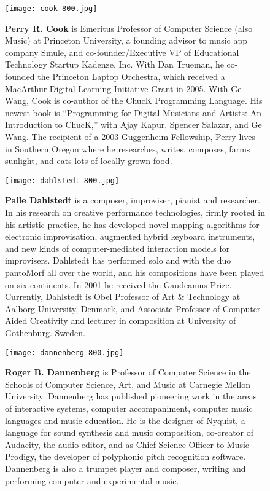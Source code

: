 \begin{authbio}
\begin{figure}[H]
  \sidecaption[t]
  \texttt{[image: cook-800.jpg]}
  \caption{\textbf{Perry R. Cook} is Emeritus Professor of Computer Science (also Music) at Princeton University, a founding advisor to music app company Smule, and co-founder/Executive VP of Educational Technology Startup Kadenze, Inc. With Dan Trueman, he co-founded the Princeton Laptop Orchestra, which received a MacArthur Digital Learning Initiative Grant in 2005. With Ge Wang, Cook is co-author of the ChucK Programming Language. His newest book is ``Programming for Digital Musicians and Artists: An Introduction to ChucK,'' with Ajay Kapur, Spencer Salazar, and Ge Wang. The recipient of a 2003 Guggenheim Fellowship, Perry lives in Southern Oregon where he researches, writes, composes, farms sunlight, and eats lots of locally grown food.}
\end{figure}

\begin{figure}[H]
  \sidecaption[t]
  \texttt{[image: dahlstedt-800.jpg]}
  \caption{\textbf{Palle Dahlstedt} is a composer, improviser, pianist and researcher. In his research on creative performance technologies, firmly rooted in his artistic practice, he has developed novel mapping algorithms for electronic improvisation, augmented hybrid keyboard instruments, and new kinds of computer-mediated interaction models for improvisers. Dahlstedt has performed solo and with the duo pantoMorf all over the world, and his compositions have been played on six continents. In 2001 he received the Gaudeamus Prize. Currently, Dahlstedt is Obel Professor of Art \& Technology at Aalborg University, Denmark, and Associate Professor of Computer-Aided Creativity and lecturer in composition at University of Gothenburg. Sweden.}
\end{figure}

\begin{figure}[H]
  \sidecaption[t]
  \texttt{[image: dannenberg-800.jpg]}
  \caption{\textbf{Roger B. Dannenberg} is Professor of Computer Science in the Schools of Computer Science, Art, and Music at Carnegie Mellon University. Dannenberg has published pioneering work in the areas of interactive systems, computer accompaniment, computer music languages and music education. He is the designer of Nyquist, a language for sound synthesis and music composition, co-creator of Audacity, the audio editor, and as Chief Science Officer to Music Prodigy, the developer of polyphonic pitch recognition software. Dannenberg is also a trumpet player and composer, writing and performing computer and experimental music.}
\end{figure}


\end{authbio}
